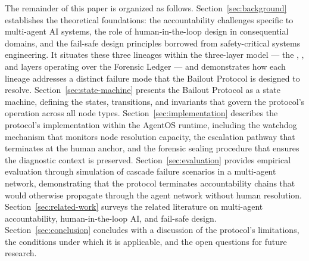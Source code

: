 The remainder of this paper is organized as follows. Section~\ref{sec:background} establishes the theoretical foundations: the accountability challenges specific to multi-agent AI systems, the role of human-in-the-loop design in consequential domains, and the fail-safe design principles borrowed from safety-critical systems engineering. It situates these three lineages within the \bxthree{} three-layer model — the \purpose{}, \truth{}, and \bounds{} layers operating over the \fact{} Forensic Ledger — and demonstrates how each lineage addresses a distinct failure mode that the Bailout Protocol is designed to resolve. Section~\ref{sec:state-machine} presents the Bailout Protocol as a state machine, defining the states, transitions, and invariants that govern the protocol's operation across all node types. Section~\ref{sec:implementation} describes the protocol's implementation within the AgentOS runtime, including the watchdog mechanism that monitors node resolution capacity, the escalation pathway that terminates at the human anchor, and the forensic sealing procedure that ensures the diagnostic context is preserved. Section~\ref{sec:evaluation} provides empirical evaluation through simulation of cascade failure scenarios in a multi-agent network, demonstrating that the protocol terminates accountability chains that would otherwise propagate through the agent network without human resolution. Section~\ref{sec:related-work} surveys the related literature on multi-agent accountability, human-in-the-loop AI, and fail-safe design. Section~\ref{sec:conclusion} concludes with a discussion of the protocol's limitations, the conditions under which it is applicable, and the open questions for future research.